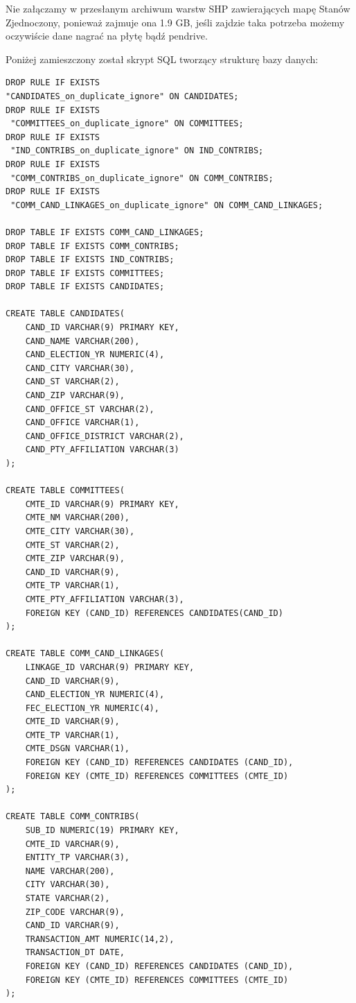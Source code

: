 \documentclass[10pt,a4paper]{article}
\begin{document}
Nie załączamy w przesłanym archiwum warstw SHP zawierających mapę Stanów Zjednoczony, ponieważ zajmuje ona 1.9 GB, jeśli zajdzie taka potrzeba możemy oczywiście dane nagrać na płytę bądź pendrive.

\bigskip

Poniżej zamieszczony został skrypt SQL tworzący strukturę bazy danych:
\begin{lstlisting}[style=BashInputStyle]
DROP RULE IF EXISTS 
"CANDIDATES_on_duplicate_ignore" ON CANDIDATES;
DROP RULE IF EXISTS
 "COMMITTEES_on_duplicate_ignore" ON COMMITTEES;
DROP RULE IF EXISTS
 "IND_CONTRIBS_on_duplicate_ignore" ON IND_CONTRIBS;
DROP RULE IF EXISTS
 "COMM_CONTRIBS_on_duplicate_ignore" ON COMM_CONTRIBS;
DROP RULE IF EXISTS
 "COMM_CAND_LINKAGES_on_duplicate_ignore" ON COMM_CAND_LINKAGES;

DROP TABLE IF EXISTS COMM_CAND_LINKAGES;
DROP TABLE IF EXISTS COMM_CONTRIBS;
DROP TABLE IF EXISTS IND_CONTRIBS;
DROP TABLE IF EXISTS COMMITTEES;
DROP TABLE IF EXISTS CANDIDATES;

CREATE TABLE CANDIDATES(
    CAND_ID VARCHAR(9) PRIMARY KEY,
    CAND_NAME VARCHAR(200),
    CAND_ELECTION_YR NUMERIC(4),
    CAND_CITY VARCHAR(30),
    CAND_ST VARCHAR(2),
    CAND_ZIP VARCHAR(9),
    CAND_OFFICE_ST VARCHAR(2),
    CAND_OFFICE VARCHAR(1),
    CAND_OFFICE_DISTRICT VARCHAR(2),
    CAND_PTY_AFFILIATION VARCHAR(3)
);

CREATE TABLE COMMITTEES(
    CMTE_ID VARCHAR(9) PRIMARY KEY,
    CMTE_NM VARCHAR(200),
    CMTE_CITY VARCHAR(30),
    CMTE_ST VARCHAR(2),
    CMTE_ZIP VARCHAR(9),
    CAND_ID VARCHAR(9),
    CMTE_TP VARCHAR(1),
    CMTE_PTY_AFFILIATION VARCHAR(3),
    FOREIGN KEY (CAND_ID) REFERENCES CANDIDATES(CAND_ID)
);

CREATE TABLE COMM_CAND_LINKAGES(
    LINKAGE_ID VARCHAR(9) PRIMARY KEY,
    CAND_ID VARCHAR(9),
    CAND_ELECTION_YR NUMERIC(4),
    FEC_ELECTION_YR NUMERIC(4),
    CMTE_ID VARCHAR(9),
    CMTE_TP VARCHAR(1),
    CMTE_DSGN VARCHAR(1),
    FOREIGN KEY (CAND_ID) REFERENCES CANDIDATES (CAND_ID),
    FOREIGN KEY (CMTE_ID) REFERENCES COMMITTEES (CMTE_ID)
);

CREATE TABLE COMM_CONTRIBS(
    SUB_ID NUMERIC(19) PRIMARY KEY,
    CMTE_ID VARCHAR(9),
    ENTITY_TP VARCHAR(3),
    NAME VARCHAR(200),
    CITY VARCHAR(30),
    STATE VARCHAR(2),
    ZIP_CODE VARCHAR(9),
    CAND_ID VARCHAR(9),
    TRANSACTION_AMT NUMERIC(14,2),
    TRANSACTION_DT DATE,
    FOREIGN KEY (CAND_ID) REFERENCES CANDIDATES (CAND_ID),
    FOREIGN KEY (CMTE_ID) REFERENCES COMMITTEES (CMTE_ID)
);


\end{lstlisting}
\end{document}
